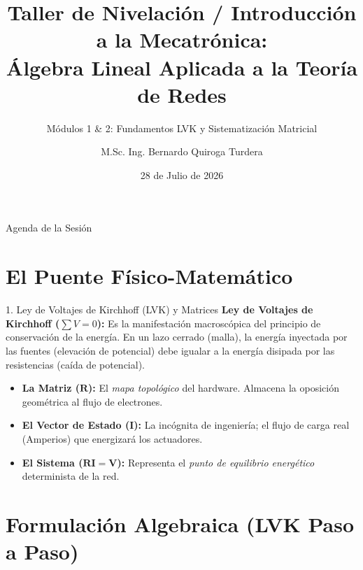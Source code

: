 \documentclass[aspectratio=169]{beamer}
\title[Nivelación - Sesión 1]{Taller de Nivelación / Introducción a la Mecatrónica:\\ Álgebra Lineal Aplicada a la Teoría de Redes}
\subtitle{Módulos 1 \& 2: Fundamentos LVK y Sistematización Matricial}
\author[M.Sc. Ing. B. Quiroga Turdera]{M.Sc. Ing. Bernardo Quiroga Turdera}
\institute[UCB Tarija]{Carrera de Ingeniería Mecatrónica\\ Universidad Católica Boliviana "San Pablo"}
\date{28 de Julio de 2026}
\begin{document}
\begin{frame}
    \titlepage
\end{frame}

\begin{frame}{Agenda de la Sesión}
    \tableofcontents
\end{frame}

\section{El Puente Físico-Matemático}

\begin{frame}{1. Ley de Voltajes de Kirchhoff (LVK) y Matrices}
    \textbf{Ley de Voltajes de Kirchhoff ($\sum V = 0$):} Es la manifestación macroscópica del principio de conservación de la energía. En un lazo cerrado (malla), la energía inyectada por las fuentes (elevación de potencial) debe igualar a la energía disipada por las resistencias (caída de potencial).
    
    \vspace{0.3cm}
    \begin{itemize}
        \item \textbf{La Matriz ($\mathbf{R}$):} El \textit{mapa topológico} del hardware. Almacena la oposición geométrica al flujo de electrones.
        \item \textbf{El Vector de Estado ($\mathbf{I}$):} La incógnita de ingeniería; el flujo de carga real (Amperios) que energizará los actuadores.
        \item \textbf{El Sistema ($\mathbf{R}\mathbf{I} = \mathbf{V}$):} Representa el \textit{punto de equilibrio energético} determinista de la red.
    \end{itemize}
\end{frame}

\section{Formulación Algebraica (LVK Paso a Paso)}
\end{document}
